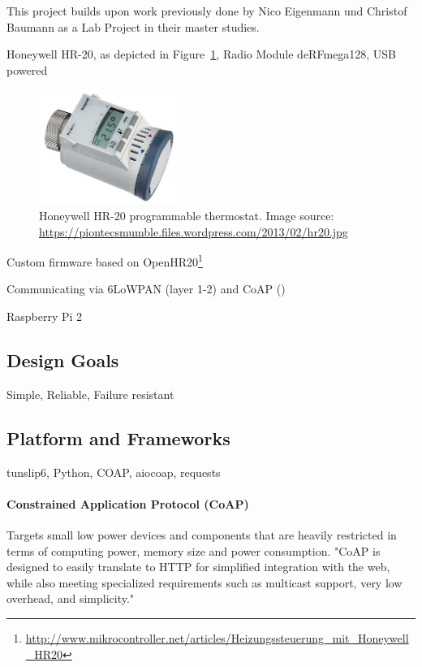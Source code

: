This project builds upon work previously done by Nico Eigenmann und Christof Baumann as a Lab Project in their master studies.


Honeywell HR-20, as depicted in Figure~\ref{fig:honeywell_hr20}, Radio Module deRFmega128, USB powered

\begin{figure}[h]
	\begin{center}
		\includegraphics[width=0.4\textwidth]{images/hr20.jpg}
	\end{center}
	\caption{Honeywell HR-20 programmable thermostat. Image source: \url{https://piontecsmumble.files.wordpress.com/2013/02/hr20.jpg}}
	\label{fig:honeywell_hr20}
\end{figure}


Custom firmware based on OpenHR20\footnote{\url{http://www.mikrocontroller.net/articles/Heizungssteuerung_mit_Honeywell_HR20}}

Communicating via 6LoWPAN (layer 1-2) and CoAP ()

Raspberry Pi 2

\subsection{Design Goals}

Simple, Reliable, Failure resistant

\subsection{Platform and Frameworks}

tunslip6, Python, COAP, aiocoap, requests

\paragraph{Constrained Application Protocol (CoAP)}
Targets small low power devices and components that are heavily restricted in terms of computing power, memory size and power consumption.
"CoAP is designed to easily translate to HTTP for simplified integration with the web, while also meeting specialized requirements such as multicast support, very low overhead, and simplicity."

